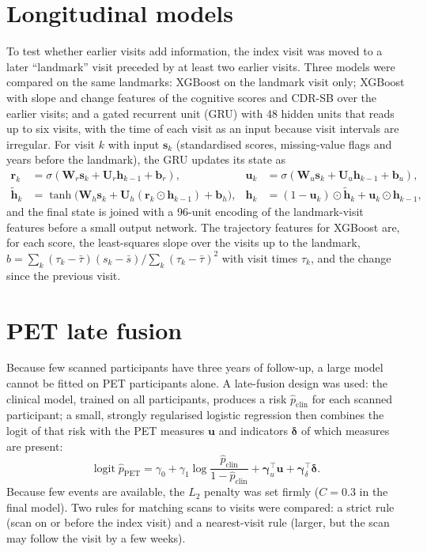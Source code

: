 \section{Longitudinal models}

To test whether earlier visits add information, the index visit was moved to a later ``landmark'' visit preceded by at least two earlier visits. Three models were compared on the same landmarks: XGBoost on the landmark visit only; XGBoost with slope and change features of the cognitive scores and CDR-SB over the earlier visits; and a gated recurrent unit (GRU) \cite{cho2014} with 48 hidden units that reads up to six visits, with the time of each visit as an input because visit intervals are irregular. For visit $k$ with input $\mathbf{s}_k$ (standardised scores, missing-value flags and years before the landmark), the GRU updates its state as
\begin{align}
\mathbf{r}_k &= \sigma(\mathbf{W}_r \mathbf{s}_k + \mathbf{U}_r \mathbf{h}_{k-1} + \mathbf{b}_r), &
\mathbf{u}_k &= \sigma(\mathbf{W}_u \mathbf{s}_k + \mathbf{U}_u \mathbf{h}_{k-1} + \mathbf{b}_u), \nonumber\\
\tilde{\mathbf{h}}_k &= \tanh\big(\mathbf{W}_h \mathbf{s}_k + \mathbf{U}_h (\mathbf{r}_k \odot \mathbf{h}_{k-1}) + \mathbf{b}_h\big), &
\mathbf{h}_k &= (1 - \mathbf{u}_k) \odot \tilde{\mathbf{h}}_k + \mathbf{u}_k \odot \mathbf{h}_{k-1},
\end{align}
and the final state is joined with a 96-unit encoding of the landmark-visit features before a small output network. The trajectory features for XGBoost are, for each score, the least-squares slope over the visits up to the landmark, $\hat{b} = \sum_k (\tau_k - \bar{\tau})(s_k - \bar{s}) / \sum_k (\tau_k - \bar{\tau})^2$ with visit times $\tau_k$, and the change since the previous visit.

\section{PET late fusion}

Because few scanned participants have three years of follow-up, a large model cannot be fitted on PET participants alone. A late-fusion design was used: the clinical model, trained on all participants, produces a risk $\hat{p}_{\text{clin}}$ for each scanned participant; a small, strongly regularised logistic regression then combines the logit of that risk with the PET measures $\mathbf{u}$ and indicators $\boldsymbol{\delta}$ of which measures are present:
\begin{equation}
\operatorname{logit} \hat{p}_{\text{PET}} = \gamma_0 + \gamma_1 \log\frac{\hat{p}_{\text{clin}}}{1 - \hat{p}_{\text{clin}}} + \boldsymbol{\gamma}_u^{\top}\mathbf{u} + \boldsymbol{\gamma}_\delta^{\top}\boldsymbol{\delta}.
\end{equation}
Because few events are available, the $L_2$ penalty was set firmly ($C = 0.3$ in the final model). Two rules for matching scans to visits were compared: a strict rule (scan on or before the index visit) and a nearest-visit rule (larger, but the scan may follow the visit by a few weeks).

